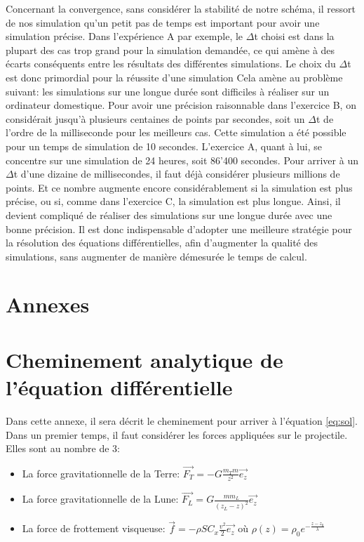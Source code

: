 \documentclass[a4paper,12pt,twoside]{article}
\begin{document}
Concernant la convergence, sans considérer la stabilité de notre schéma, il ressort de nos simulation qu'un petit pas de temps est important pour avoir une simulation précise.
Dans l'expérience A par exemple, le $\Delta$t choisi est dans la plupart des cas trop grand pour la simulation demandée, ce qui amène à des écarts conséquents entre les résultats des différentes simulations.
Le choix du $\Delta$t est donc primordial pour la réussite d'une simulation
Cela amène au problème suivant: les simulations sur une longue durée sont difficiles à réaliser sur un ordinateur domestique.
Pour avoir une précision raisonnable dans l'exercice B, on considérait jusqu'à plusieurs centaines de points par secondes, soit un $\Delta$t de l'ordre de la milliseconde pour les meilleurs cas.
Cette simulation a été possible pour un temps de simulation de 10 secondes.
L'exercice A, quant à lui, se concentre sur une simulation de 24 heures, soit 86'400 secondes.
Pour arriver à un $\Delta$t d'une dizaine de millisecondes, il faut déjà considérer plusieurs millions de points.
Et ce nombre augmente encore considérablement si la simulation est plus précise, ou si, comme dans l'exercice C, la simulation est plus longue.
Ainsi, il devient compliqué de réaliser des simulations sur une longue durée avec une bonne précision.
Il est donc indispensable d'adopter une meilleure stratégie pour la résolution des équations différentielles, afin d'augmenter la qualité des simulations, sans augmenter de manière démesurée le temps de calcul.


\appendix
\section*{Annexes}
\section{Cheminement analytique de l'équation différentielle}
Dans cette annexe, il sera décrit le cheminement pour arriver à l'équation \ref{eq:sol}.
Dans un premier temps, il faut considérer les forces appliquées sur le projectile.
Elles sont au nombre de 3:
\begin{itemize}
	\item La force gravitationnelle de la Terre: $\vec{F_T} = -G\frac{m_T m}{z^2}\vec{e_z}$ \cite{ref:ansermet}
	\item La force gravitationnelle de la Lune: $\vec{F_L} = G\frac{m m_L }{(z_L-z)^2}\vec{e_z}$
	\item La force de frottement visqueuse: $\vec{f} = - \rho S C_x \frac{v^2}{2}\vec{e_z}$ où $\rho (z) = \rho_0 e^{-\frac{z-z_0}{\lambda}}$
\end{itemize}
\end{document}
